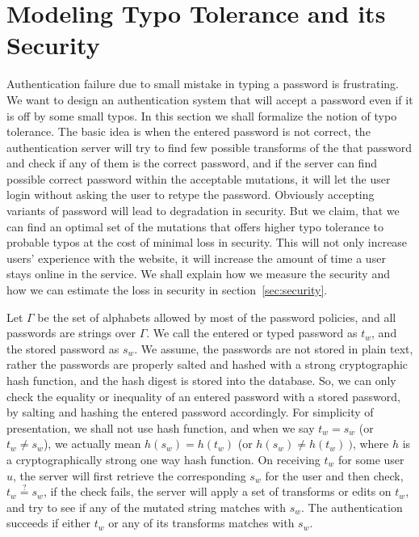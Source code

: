\section{Modeling Typo Tolerance and its Security}
\label{sec:model}

\def\E{{\mathcal{E}}}

Authentication failure due to small mistake in typing a password is
frustrating. We want to design an authentication system that will accept a
password even if it is off by some small typos. In this section we shall
formalize the notion of typo tolerance. The basic idea is when the entered
password is not correct, the authentication server will try to find few possible
transforms of the that password and check if any of them is the correct password,
and if the server can find possible correct password within the acceptable
mutations, it will let the user login without asking the user to retype the
password. Obviously accepting variants of password will lead to degradation in
security. But we claim, that we can find an optimal set of the mutations that
offers higher typo tolerance to probable typos at the cost of minimal loss in
security. This will not only increase users' experience with the website, it
will increase the amount of time a user stays online in the service. We shall
explain how we measure the security and how we can estimate the loss in security
in section~\ref{sec:security}.

Let $\Gamma$ be the set of alphabets allowed by most of the password policies,
and all passwords are strings over $\Gamma$.  We call the entered or typed
password as $t_{w}$, and the stored password as $s_w$.  We assume, the passwords
are not stored in plain text, rather the passwords are properly salted and
hashed with a strong cryptographic hash function, and the hash digest is stored
into the database. So, we can only check the equality or inequality of an
entered password with a stored password, by salting and hashing the entered
password accordingly.  For simplicity of presentation, we shall not use hash
function, and when we say $t_w=s_w$ (or $t_w\ne s_w$), we actually mean
$h(s_w)=h(t_w)$ (or $h(s_w)\ne h(t_w)~)$, where $h$ is a cryptographically
strong one way hash function. On receiving $t_w$ for some user $u$, the server
will first retrieve the corresponding $s_w$ for the user and then check,
$t_w\stackrel{?}{=}s_w$, if the check fails, the server will apply a set of
transforms or edits on $t_w$, and try to see if any of the mutated string
matches with $s_w$. The authentication succeeds if either $t_w$ or any of its
transforms matches with $s_w$.

